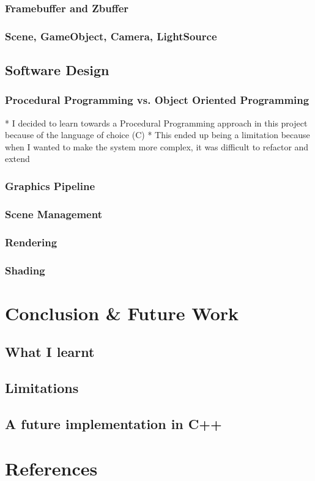 \documentclass{article}
\begin{document}
\subsubsection{Framebuffer and Zbuffer}
\subsubsection{Scene, GameObject, Camera, LightSource}

\subsection{Software Design}
\subsubsection{Procedural Programming vs. Object Oriented Programming}
* I decided to learn towards a Procedural Programming approach in this project because of the language of choice (C)
* This ended up being a limitation because when I wanted to make the system more complex, it was difficult to refactor and extend

\subsubsection{Graphics Pipeline}

\subsubsection{Scene Management}
\subsubsection{Rendering}
\subsubsection{Shading}

\section{Conclusion \& Future Work}

\subsection{What I learnt}

\subsection{Limitations}

\subsection{A future implementation in C++}


\section{References}
\end{document}
